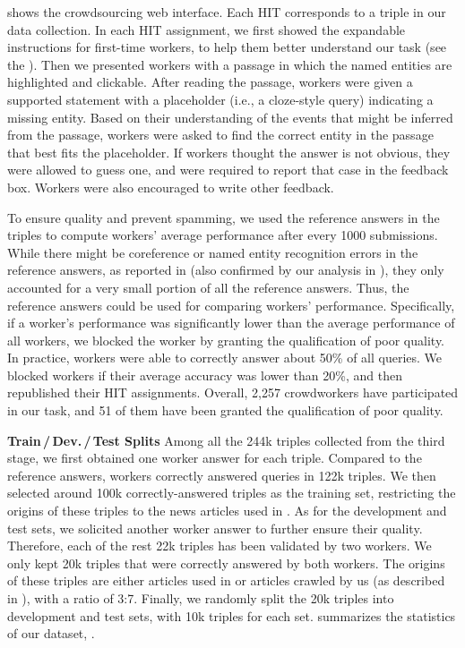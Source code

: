  shows the crowdsourcing web interface.
Each HIT corresponds to a triple in our data collection.
In each HIT assignment, we first showed the expandable instructions for first-time workers, to help them better understand our task (see the ).
Then we presented workers with a passage in which the named entities are highlighted and clickable.
After reading the passage, workers were given a supported statement with a placeholder (i.e., a cloze-style query) indicating a missing entity.
Based on their understanding of the events that might be inferred from the passage, workers were asked to find the correct entity in the passage that best fits the placeholder. 
If workers thought the answer is not obvious, they were allowed to guess one, and were required to report that case in the feedback box.
Workers were also encouraged to write other feedback.

To ensure quality and prevent spamming, we used the reference answers in the triples to compute workers' average performance after every 1000 submissions. 
While there might be coreference or named entity recognition errors in the reference answers, 
as reported in \citet{exam-of-cnn-dailymail} (also confirmed by our analysis in ), they only accounted for a very small portion of all the reference answers. Thus, the reference answers could be used for comparing workers' performance. 
Specifically, if a worker's performance was significantly lower than the average performance of all workers, we blocked the worker by granting the qualification of poor quality.
In practice, workers were able to correctly answer about 50\% of all queries. 
We blocked workers if their average accuracy was lower than 20\%, and then republished their HIT assignments.
Overall, 2,257 crowdworkers have participated in our task, and 51 of them have been granted the qualification of poor quality. 

\noindent\textbf{Train\,/\,Dev.\,/\,Test Splits}
Among all the 244k triples collected from the third stage, we first obtained one worker answer for each triple. 
Compared to the reference answers, workers correctly answered queries in 122k triples.
We then selected around 100k correctly-answered triples as the training set,
restricting the origins of these triples to the news articles used in \citet{deepmind-cnn-dailymail}.
As for the development and test sets, we solicited another worker answer to further ensure their quality.
Therefore, each of the rest 22k triples has been validated by two workers.
We only kept 20k triples that were correctly answered by both workers.
The origins of these triples are either articles used in \citet{deepmind-cnn-dailymail} or articles crawled by us (as described in ), with a ratio of 3:7.
Finally, we randomly split the 20k triples into development and test sets, with 10k triples for each set.
 summarizes the statistics of our dataset, \ReCoRD.

